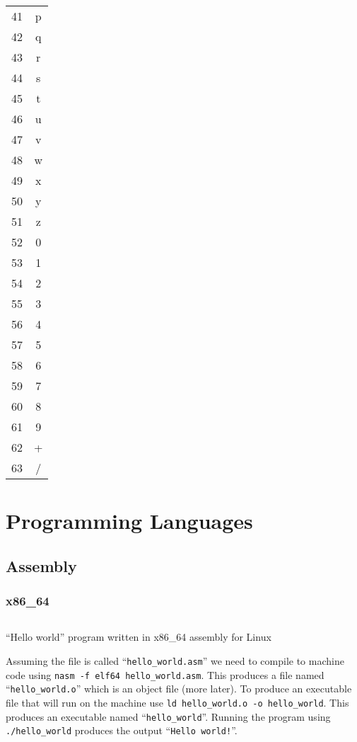\documentclass[12pt]{book}
\begin{document}
{\begin{tabular}{c c}
    41 & p \\
    42 & q \\
    43 & r \\
    44 & s \\
    45 & t \\
    46 & u \\
    47 & v \\
    48 & w \\
    49 & x \\
    50 & y \\
    51 & z \\
    52 & 0 \\
    53 & 1 \\
    54 & 2 \\
    55 & 3 \\
    56 & 4 \\
    57 & 5 \\
    58 & 6 \\
    59 & 7 \\
    60 & 8 \\
    61 & 9 \\
    62 & + \\
    63 & / \\
  \end{tabular}}

  \chapter{Programming Languages}

  \section{Assembly}

  \subsection{x86\_64}

  \begin{listing}[H]
    \inputminted[frame=lines]{asm}{code/hello_world.asm}
    \caption{``Hello world'' program written in x86\_64 assembly for Linux}
    \label{lst:hello-world-asm}
  \end{listing}

  Assuming the file is called ``\texttt{hello_world.asm}'' we need
  to compile to machine code using
  \texttt{nasm -f elf64 hello_world.asm}. This produces a file
  named ``\texttt{hello_world.o}'' which is an object file (more
  later). To produce an executable file that will run on the machine use
  \texttt{ld hello_world.o -o hello_world}. This produces an
  executable named ``\texttt{hello_world}''. Running the program
  using \texttt{./hello_world} produces the output
  ``\texttt{Hello world!}''.
\end{document}
